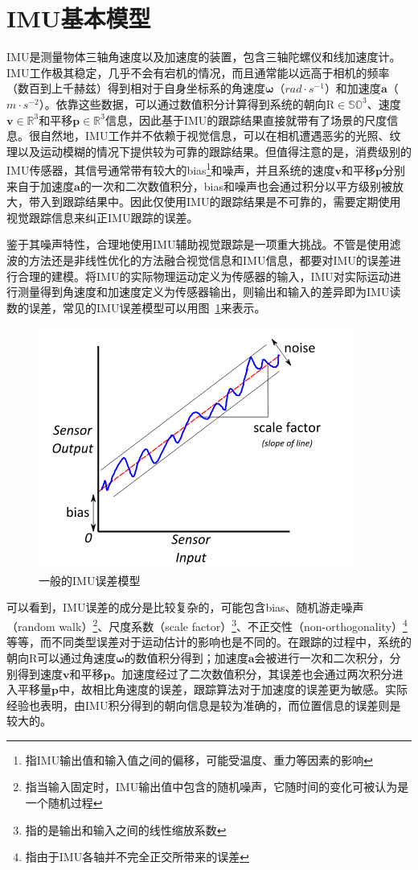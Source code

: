\section{IMU基本模型}

IMU是测量物体三轴角速度以及加速度的装置，包含三轴陀螺仪和线加速度计。IMU工作极其稳定，几乎不会有宕机的情况，而且通常能以远高于相机的频率（数百到上千赫兹）得到相对于自身坐标系的角速度$\bm{\omega}$（$rad \cdot s^{-1}$）和加速度$\bm{a}$（$m \cdot s^{-2}$）。依靠这些数据，可以通过数值积分计算得到系统的朝向$\mathrm{R}\in\mathbb{SO}^3$、速度$\bm{v}\in\mathbb{R}^3$和平移$\bm{p}\in\mathbb{R}^3$信息，因此基于IMU的跟踪结果直接就带有了场景的尺度信息。很自然地，IMU工作并不依赖于视觉信息，可以在相机遭遇恶劣的光照、纹理以及运动模糊的情况下提供较为可靠的跟踪结果。但值得注意的是，消费级别的IMU传感器，其信号通常带有较大的bias\footnote{指IMU输出值和输入值之间的偏移，可能受温度、重力等因素的影响}和噪声，并且系统的速度$\bm{v}$和平移$\bm{p}$分别来自于加速度$\bm{a}$的一次和二次数值积分，bias和噪声也会通过积分以平方级别被放大，带入到跟踪结果中。因此仅使用IMU的跟踪结果是不可靠的，需要定期使用视觉跟踪信息来纠正IMU跟踪的误差。

鉴于其噪声特性，合理地使用IMU辅助视觉跟踪是一项重大挑战。不管是使用滤波的方法还是非线性优化的方法融合视觉信息和IMU信息，都要对IMU的误差进行合理的建模。将IMU的实际物理运动定义为传感器的输入，IMU对实际运动进行测量得到角速度和加速度定义为传感器输出，则输出和输入的差异即为IMU读数的误差，常见的IMU误差模型可以用图~\ref{fig:common_imu_errors}来表示。

\begin{figure}[htb!]
    \centering
    \includegraphics[width=.4\textwidth]{./figs/common_imu_errors.png}
    \caption{一般的IMU误差模型\citep{imu2014}}
    \label{fig:common_imu_errors}
\end{figure}

可以看到，IMU误差的成分是比较复杂的，可能包含bias、随机游走噪声（random walk）\footnote{指当输入固定时，IMU输出值中包含的随机噪声，它随时间的变化可被认为是一个随机过程}、尺度系数（scale factor）\footnote{指的是输出和输入之间的线性缩放系数}、不正交性（non-orthogonality）\footnote{指由于IMU各轴并不完全正交所带来的误差}等等\citep{imu2014}，而不同类型误差对于运动估计的影响也是不同的。在跟踪的过程中，系统的朝向$\mathrm{R}$可以通过角速度$\bm{\omega}$的数值积分得到；加速度$\bm{a}$会被进行一次和二次积分，分别得到速度$\bm{v}$和平移$\bm{p}$。加速度经过了二次数值积分，其误差也会通过两次积分进入平移量$\bm{p}$中，故相比角速度的误差，跟踪算法对于加速度的误差更为敏感。实际经验也表明，由IMU积分得到的朝向信息是较为准确的，而位置信息的误差则是较大的。

